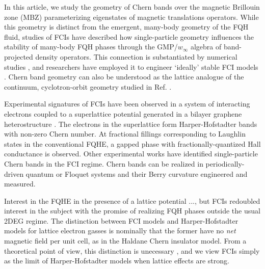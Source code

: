 \documentclass[aps,prb,twocolumn,letterpaper,twoside,nobalancelastpage,groupedaddress,amsmath,amssymb,floatfix,citeautoscript]{revtex4-1}
\begin{document}
 In this article, we study the geometry of Chern bands over the magnetic Brillouin zone (MBZ) parameterizing eigenstates of magnetic translations operators\cite{zak_magnetic_1964}. While this geometry is distinct from the emergent, many-body geometry of the FQH fluid, studies of FCIs have described how single-particle geometry influences the stability of many-body FQH phases through the GMP/$w_{\infty}$ algebra of band-projected density operators.\cite{Girvin:1986bu,parameswaran_fractional_2012,parameswaran_fractional_2013, roy_band_2014} This connection is substantiated by numerical studies \cite{jackson_geometric_2015,Claassen2015,bauer_quantum_2016}, and researchers have employed it to engineer `ideally' stable FCI models \cite{Lee2017}. Chern band geometry can also be understood as the lattice analogue of the continuum, cyclotron-orbit geometry studied in Ref. .

 Experimental signatures of FCIs have been observed in a system of interacting electrons coupled to a superlattice potential generated in a bilayer graphene heterostructure \cite{Spantoneaan8458}. The electrons in the superlattice form Harper-Hofstadter bands with non-zero Chern number. At fractional fillings corresponding to Laughlin states in the conventional FQHE, a gapped phase with fractionally-quantized Hall conductance is observed. \cite{Spantoneaan8458} Other experimental works have identified single-particle Chern bands in the FCI regime. \cite{Jotzu2014,Aidelsburger:2014hm,Aidelsburger:2013ew} Chern bands can be realized in periodically-driven quantum or Floquet systems and their Berry curvature engineered and measured.\cite{Flaschner1091}

Interest in the FQHE in the presence of a lattice potential \cite{kol_fractional_1993,palmer_high-field_2006}..., but FCIs redoubled interest in the subject with the promise of realizing FQH phases outside the usual 2DEG regime. The distinction between FCI models and Harper-Hofstadter \cite{harper_general_1955,Azbel:1964tk,hofstadter_energy_1976} models for lattice electron gasses is nominally that the former have no \textit{net} magnetic field per unit cell, as in the Haldane Chern insulator model\cite{haldane_model_1988}. From a theoretical point of view, this distinction is unecessary \cite{mcgreevy_wave_2012}, and we view FCIs simply as the limit of Harper-Hofstadter models when lattice effects are strong. 
\end{document}
